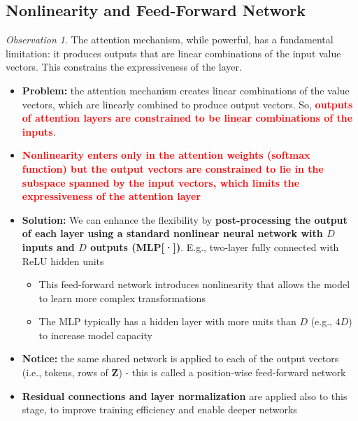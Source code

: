\documentclass[11pt,a4paper]{article}
\theoremstyle{definition}
\theoremstyle{plain}
\theoremstyle{remark}
\newtheorem*{observation}{Observation}
\begin{document}
\subsection{Nonlinearity and Feed-Forward Network}

\begin{observation}
The attention mechanism, while powerful, has a fundamental limitation: it produces outputs that are linear combinations of the input value vectors. This constrains the expressiveness of the layer.
\end{observation}

\begin{itemize}
    \item \textbf{Problem:} the attention mechanism creates linear combinations of the value vectors, which are linearly combined to produce output vectors. So, \textcolor{red}{\textbf{outputs of attention layers are constrained to be linear combinations of the inputs}}.
    
    \item \textcolor{red}{\textbf{Nonlinearity enters only in the attention weights (softmax function) but the output vectors are constrained to lie in the subspace spanned by the input vectors, which limits the expressiveness of the attention layer}}
    
    \item \textbf{Solution:} We can enhance the flexibility by \textbf{post-processing the output of each layer using a standard nonlinear neural network with $D$ inputs and $D$ outputs (MLP[·])}. E.g., two-layer fully connected with ReLU hidden units
    
    \begin{itemize}
        \item This feed-forward network introduces nonlinearity that allows the model to learn more complex transformations
        \item The MLP typically has a hidden layer with more units than $D$ (e.g., $4D$) to increase model capacity
    \end{itemize}
    
    \item \textbf{Notice:} the same shared network is applied to each of the output vectors (i.e., tokens, rows of $\mathbf{Z}$) - this is called a position-wise feed-forward network
    
    \item \textbf{Residual connections and layer normalization} are applied also to this stage, to improve training efficiency and enable deeper networks
\end{itemize}
\end{document}
